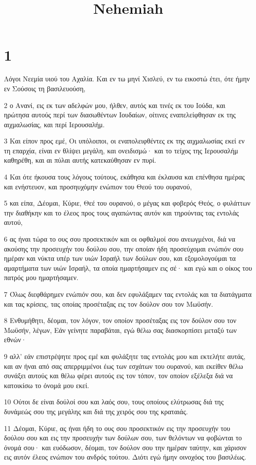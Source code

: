 

\title{Nehemiah}


\chapter{1}

\par Λόγοι Νεεμία υιού του Αχαλία. Και εν τω μηνί Χισλεύ, εν τω εικοστώ έτει, ότε ήμην εν Σούσοις τη βασιλευούση,
\par 2 ο Ανανί, εις εκ των αδελφών μου, ήλθεν, αυτός και τινές εκ του Ιούδα, και ηρώτησα αυτούς περί των διασωθέντων Ιουδαίων, οίτινες εναπελείφθησαν εκ της αιχμαλωσίας, και περί Ιερουσαλήμ.
\par 3 Και είπον προς εμέ, Οι υπόλοιποι, οι εναπολειφθέντες εκ της αιχμαλωσίας εκεί εν τη επαρχία, είναι εν θλίψει μεγάλη, και ονειδισμώ· και το τείχος της Ιερουσαλήμ καθηρέθη, και αι πύλαι αυτής κατεκαύθησαν εν πυρί.
\par 4 Και ότε ήκουσα τους λόγους τούτους, εκάθησα και έκλαυσα και επένθησα ημέρας και ενήστευον, και προσηυχόμην ενώπιον του Θεού του ουρανού,
\par 5 και είπα, Δέομαι, Κύριε, Θεέ του ουρανού, ο μέγας και φοβερός Θεός, ο φυλάττων την διαθήκην και το έλεος προς τους αγαπώντας αυτόν και τηρούντας τας εντολάς αυτού,
\par 6 ας ήναι τώρα το ους σου προσεκτικόν και οι οφθαλμοί σου ανεωγμένοι, διά να ακούσης την προσευχήν του δούλου σου, την οποίαν ήδη προσεύχομαι ενώπιόν σου ημέραν και νύκτα υπέρ των υιών Ισραήλ των δούλων σου, και εξομολογούμαι τα αμαρτήματα των υιών Ισραήλ, τα οποία ημαρτήσαμεν εις σέ· και εγώ και ο οίκος του πατρός μου ημαρτήσαμεν.
\par 7 Όλως διεφθάρημεν ενώπιόν σου, και δεν εφυλάξαμεν τας εντολάς και τα διατάγματα και τας κρίσεις, τας οποίας προσέταξας εις τον δούλον σου τον Μωϋσήν.
\par 8 Ενθυμήθητι, δέομαι, τον λόγον, τον οποίον προσέταξας εις τον δούλον σου τον Μωϋσήν, λέγων, Εάν γείνητε παραβάται, εγώ θέλω σας διασκορπίσει μεταξύ των εθνών·
\par 9 αλλ' εάν επιστρέψητε προς εμέ και φυλάξητε τας εντολάς μου και εκτελήτε αυτάς, και αν ήναι από σας απερριμμένοι έως των εσχάτων του ουρανού, και εκείθεν θέλω συνάξει αυτούς και θέλω φέρει αυτούς εις τον τόπον, τον οποίον εξέλεξα διά να κατοικίσω το όνομά μου εκεί.
\par 10 Ούτοι δε είναι δούλοί σου και λαός σου, τους οποίους ελύτρωσας διά της δυνάμεώς σου της μεγάλης και διά της χειρός σου της κραταιάς.
\par 11 Δέομαι, Κύριε, ας ήναι ήδη το ους σου προσεκτικόν εις την προσευχήν του δούλου σου και εις την προσευχήν των δούλων σου, των θελόντων να φοβώνται το όνομά σου· και ευόδωσον, δέομαι, τον δούλον σου την ημέραν ταύτην, και χάρισον εις αυτόν έλεος ενώπιον του ανδρός τούτου. Διότι εγώ ήμην οινοχόος του βασιλέως.

